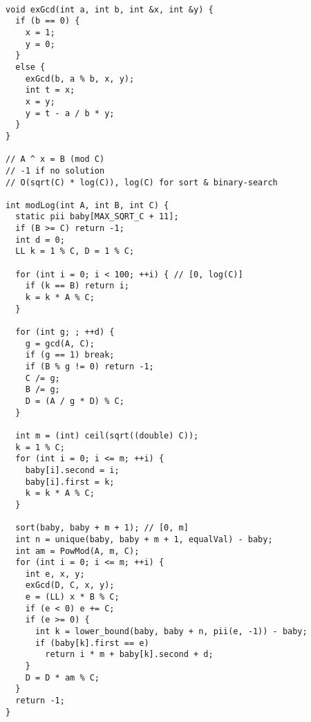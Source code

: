 \begin{lstlisting}

void exGcd(int a, int b, int &x, int &y) {
  if (b == 0) {
    x = 1;
    y = 0;
  }
  else {
    exGcd(b, a % b, x, y);
    int t = x;
    x = y;
    y = t - a / b * y;
  }
}

// A ^ x = B (mod C)
// -1 if no solution
// O(sqrt(C) * log(C)), log(C) for sort & binary-search

int modLog(int A, int B, int C) {
  static pii baby[MAX_SQRT_C + 11];
  if (B >= C) return -1;
  int d = 0;
  LL k = 1 % C, D = 1 % C;

  for (int i = 0; i < 100; ++i) { // [0, log(C)]
    if (k == B) return i;
    k = k * A % C;
  }

  for (int g; ; ++d) {
    g = gcd(A, C);
    if (g == 1) break;
    if (B % g != 0) return -1;
    C /= g;
    B /= g;
    D = (A / g * D) % C;
  }

  int m = (int) ceil(sqrt((double) C));
  k = 1 % C;
  for (int i = 0; i <= m; ++i) {
    baby[i].second = i;
    baby[i].first = k;
    k = k * A % C;
  }

  sort(baby, baby + m + 1); // [0, m]
  int n = unique(baby, baby + m + 1, equalVal) - baby;
  int am = PowMod(A, m, C);
  for (int i = 0; i <= m; ++i) {
    int e, x, y;
    exGcd(D, C, x, y);
    e = (LL) x * B % C;
    if (e < 0) e += C;
    if (e >= 0) {
      int k = lower_bound(baby, baby + n, pii(e, -1)) - baby;
      if (baby[k].first == e)
        return i * m + baby[k].second + d;
    }
    D = D * am % C;
  }
  return -1;
}

\end{lstlisting}